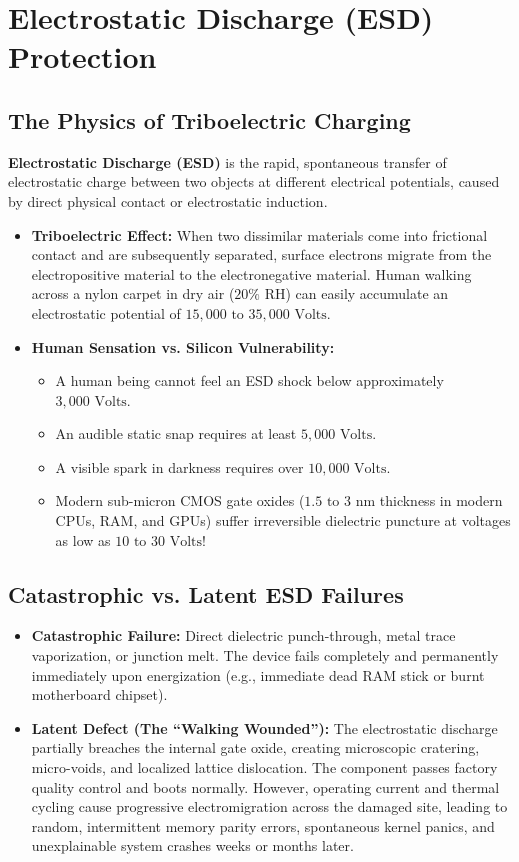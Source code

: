 \section{Electrostatic Discharge (ESD) Protection}

\subsection{The Physics of Triboelectric Charging}
\textbf{Electrostatic Discharge (ESD)} is the rapid, spontaneous transfer of electrostatic charge between two objects at different electrical potentials, caused by direct physical contact or electrostatic induction.
\begin{itemize}[leftmargin=*]
    \item \textbf{Triboelectric Effect:} When two dissimilar materials come into frictional contact and are subsequently separated, surface electrons migrate from the electropositive material to the electronegative material. Human walking across a nylon carpet in dry air ($20\%$ RH) can easily accumulate an electrostatic potential of \textbf{$15,000\text{ to }35,000\text{ Volts}$}.
    \item \textbf{Human Sensation vs. Silicon Vulnerability:}
    \begin{itemize}
        \item A human being cannot feel an ESD shock below approximately \textbf{$3,000\text{ Volts}$}.
        \item An audible static snap requires at least \textbf{$5,000\text{ Volts}$}.
        \item A visible spark in darkness requires over \textbf{$10,000\text{ Volts}$}.
        \item Modern sub-micron CMOS gate oxides ($1.5\text{ to }3\text{ nm}$ thickness in modern CPUs, RAM, and GPUs) suffer irreversible dielectric puncture at voltages as low as \textbf{$10\text{ to }30\text{ Volts}$}!
    \end{itemize}
\end{itemize}

\subsection{Catastrophic vs. Latent ESD Failures}
\begin{itemize}[leftmargin=*]
    \item \textbf{Catastrophic Failure:} Direct dielectric punch-through, metal trace vaporization, or junction melt. The device fails completely and permanently immediately upon energization (e.g., immediate dead RAM stick or burnt motherboard chipset).
    \item \textbf{Latent Defect (The ``Walking Wounded''):} The electrostatic discharge partially breaches the internal gate oxide, creating microscopic cratering, micro-voids, and localized lattice dislocation. The component passes factory quality control and boots normally. However, operating current and thermal cycling cause progressive electromigration across the damaged site, leading to random, intermittent memory parity errors, spontaneous kernel panics, and unexplainable system crashes weeks or months later.
\end{itemize}

